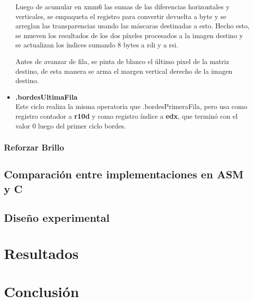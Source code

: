 \documentclass[a4paper]{article}
\begin{document}
\begin{itemize}
	Luego de acumular en xmm6 las sumas de las diferencias horizontales y verticales, se empaqueta el registro para convertir devuelta a byte y se arreglan las transparencias usando las máscaras destinadas a esto. Hecho esto, se mueven los resultados de los dos píxeles procesados a la imagen destino y se actualizan los índices sumando 8 bytes a rdi y a rsi.
	
	Antes de avanzar de fila, se pinta de blanco el último pixel de la matriz destino, de esta manera se arma el margen vertical derecho de la imagen destino.
	\item \textbf{.bordesUltimaFila}\\
	Este ciclo realiza la misma operatoria que .bordesPrimeraFila, pero usa como registro contador a \textbf{r10d} y como registro índice a \textbf{edx}, que terminó con el valor 0 luego del primer ciclo bordes.
\end{itemize}
	



   
\subsubsection{Reforzar Brillo}


\subsection{Comparación entre implementaciones en ASM y C}

\subsection{Diseño experimental}



\section{Resultados}
%

\section{Conclusión}
\end{document}
